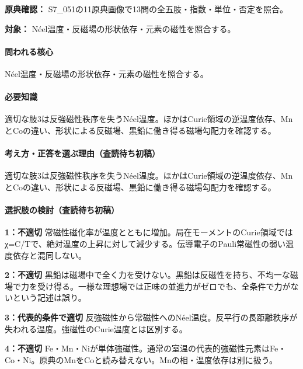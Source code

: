 \noindent\textbf{原典確認：} S7\_051の11原典画像で13問の全五肢・指数・単位・否定を照合。\par

\noindent\textbf{対象：} Néel温度・反磁場の形状依存・元素の磁性を照合する。\par

\paragraph{問われる核心} Néel温度・反磁場の形状依存・元素の磁性を照合する。

\paragraph{必要知識} 適切な肢3は反強磁性秩序を失うNéel温度。ほかはCurie領域の逆温度依存、MnとCoの違い、形状による反磁場、黒鉛に働き得る磁場勾配力を確認する。

\paragraph{考え方・正答を選ぶ理由（査読待ち初稿）} 適切な肢3は反強磁性秩序を失うNéel温度。ほかはCurie領域の逆温度依存、MnとCoの違い、形状による反磁場、黒鉛に働き得る磁場勾配力を確認する。

\paragraph{選択肢の検討（査読待ち初稿）}\mbox{}\par

\noindent\textbf{1：不適切} 常磁性磁化率が温度とともに増加。局在モーメントのCurie領域ではχ=C/Tで、絶対温度の上昇に対して減少する。伝導電子のPauli常磁性の弱い温度依存と混同しない。\par

\noindent\textbf{2：不適切} 黒鉛は磁場中で全く力を受けない。黒鉛は反磁性を持ち、不均一な磁場で力を受け得る。一様な理想場では正味の並進力がゼロでも、全条件で力がないという記述は誤り。\par

\noindent\textbf{3：代表的条件で適切} 反強磁性から常磁性へのNéel温度。反平行の長距離秩序が失われる温度。強磁性のCurie温度とは区別する。\par

\noindent\textbf{4：不適切} Fe・Mn・Niが単体強磁性。通常の室温の代表的強磁性元素はFe・Co・Ni。原典のMnをCoと読み替えない。Mnの相・温度依存は別に扱う。\par

